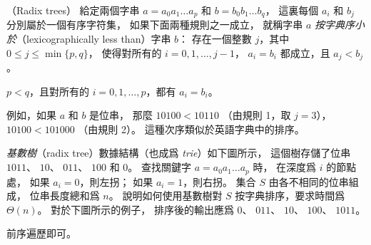 \startPROBLEM
（Radix trees）
給定兩個字串 $a=a_0 a_1 \ldots a_p$ 和 $b=b_0 b_1 \ldots b_q$，
這裏每個 $a_i$ 和 $b_j$ 分別屬於一個有序字符集，
如果下面兩種規則之一成立，
就稱字串 $a$ \emph{按字典序小於}（lexicographically less than）字串 $b$：
\startigBase[n]
\startitem
存在一個整數 $j$，其中 $0\le j \le \min\{p,q\}$，
使得對所有的 $i=0,1,\ldots,j-1$， $a_i=b_i$ 都成立，且 $a_j < b_j$。
\stopitem

\startitem
$p<q$，且對所有的 $i=0,1,\ldots,p$，都有 $a_i=b_i$。
\stopitem
\stopigBase

例如，如果 $a$ 和 $b$ 是位串，
那麼 $10 100 < 10 110$ （由規則 1，取 $j=3$），
 $10 100 < 101 000$ （由規則 2）。
這種次序類似於英語字典中的排序。

\emph{基數樹}（radix tree）數據結構（也成爲 \emph{trie}）如下圖所示，
這個樹存儲了位串 $1011$、 $10$、 $011$、 $100$ 和 $0$。
查找關鍵字 $a=a_0 a_1 \ldots a_p$ 時，
在深度爲 $i$ 的節點處，
如果 $a_i=0$，則左拐；
如果 $a_i=1$，則右拐。
集合 $S$ 由各不相同的位串組成，
位串長度總和爲 $n$。
說明如何使用基數樹對 $S$ 按字典排序，要求時間爲 $\Theta(n)$。
對於下圖所示的例子，
排序後的輸出應爲 $0$、 $011$、 $10$、 $100$、 $1011$。

\externalfigure[output/p12_2-1]
\stopPROBLEM

\startANSWER
前序遍歷即可。
\stopANSWER
